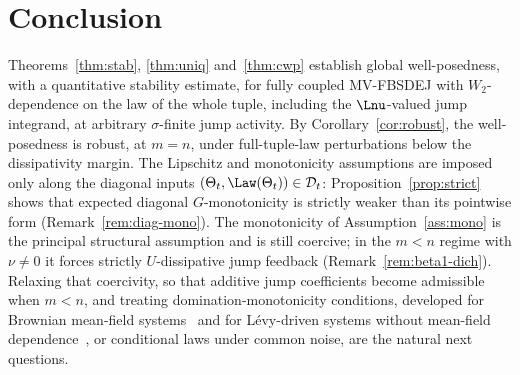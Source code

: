 \section{Conclusion}\label{sec:conclusion}

Theorems~\ref{thm:stab}, \ref{thm:uniq} and~\ref{thm:cwp} establish global well-posedness, with a quantitative
stability estimate, for fully coupled MV-FBSDEJ with $W_2$-dependence on the law of the whole
tuple, including the $\Lnu$-valued jump integrand, at arbitrary $\sigma$-finite jump activity.
By Corollary~\ref{cor:robust}, the well-posedness is robust, at $m=n$, under full-tuple-law
perturbations below the dissipativity margin. The Lipschitz and monotonicity assumptions are imposed only along the diagonal inputs
$(\Theta_t,\Law(\Theta_t))\in\mathcal D_t$:
Proposition~\ref{prop:strict} shows that expected diagonal $G$-monotonicity is strictly
weaker than its pointwise form (Remark~\ref{rem:diag-mono}). The monotonicity of
Assumption~\ref{ass:mono} is the principal structural assumption and is still coercive; in the $m<n$ regime with $\nu\neq0$ it
forces strictly $U$-dissipative jump feedback (Remark~\ref{rem:beta1-dich}). Relaxing that coercivity, so that additive jump coefficients
become admissible when $m<n$, and treating domination-monotonicity conditions, developed
for Brownian mean-field systems~\cite{ChenNie,TianYu,WuHao} and for L\'evy-driven systems
without mean-field dependence~\cite{XuTangMeng}, or conditional laws under common noise,
are the natural next questions.


